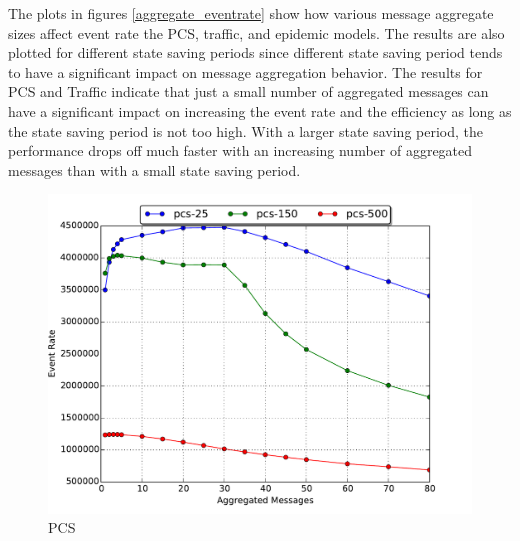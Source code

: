 \documentclass[11pt]{book}
\begin{document}
The plots in figures \ref{aggregate_eventrate} show how various message aggregate sizes affect
event rate the PCS, traffic, and epidemic models.  The results are also plotted for different
state saving periods since different state saving period tends to have a significant impact
on message aggregation behavior.  The results for PCS and Traffic indicate that just a small
number of aggregated messages can have a significant impact on increasing the event rate and
the efficiency as long as the state saving period is not too high.  With a larger state saving
period, the performance drops off much faster with an increasing number of aggregated messages
than with a small state saving period.

\begin{figure}
  \begin{minipage}{.5\textwidth}
    \begin{center}
      \includegraphics[width=\textwidth,keepaspectratio,quiet]{figs/partitioning_communication/aggregate_pcs_eventrate.pdf} \\
      PCS \\
    \end{center}
  \end{minipage}%
  \hfill
  \begin{minipage}{.5\textwidth}
    \begin{center}

\end{center}
\end{minipage}
\end{figure}
\end{document}
